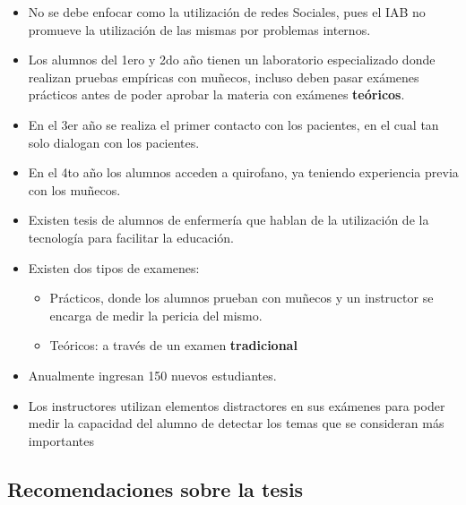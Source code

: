 \begin{itemize}
\itemsep1pt\parskip0pt
\item
  No se debe enfocar como la utilización de redes Sociales, pues el IAB
  no promueve la utilización de las mismas por problemas internos.
\item
  Los alumnos del 1ero y 2do año tienen un laboratorio especializado
  donde realizan pruebas empíricas con muñecos, incluso deben pasar
  exámenes prácticos antes de poder aprobar la materia con exámenes
  \textbf{teóricos}.
\item
  En el 3er año se realiza el primer contacto con los pacientes, en el
  cual tan solo dialogan con los pacientes.
\item
  En el 4to año los alumnos acceden a quirofano, ya teniendo experiencia
  previa con los muñecos.
\item
  Existen tesis de alumnos de enfermería que hablan de la utilización de
  la tecnología para facilitar la educación.
\item
  Existen dos tipos de examenes:

  \begin{itemize}
  \itemsep1pt\parskip0pt
  \item
    Prácticos, donde los alumnos prueban con muñecos y un instructor se
    encarga de medir la pericia del mismo.
  \item
    Teóricos: a través de un examen \textbf{tradicional}
  \end{itemize}
\item
  Anualmente ingresan 150 nuevos estudiantes.
\item
  Los instructores utilizan elementos distractores en sus exámenes para
  poder medir la capacidad del alumno de detectar los temas que se
  consideran más importantes
\end{itemize}

\subsection{Recomendaciones sobre la
tesis}

